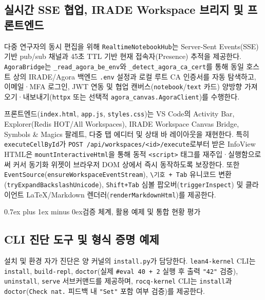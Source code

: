 \documentclass[journal]{IEEEtran}
\makeatletter
\def\section{\@startsection{section}{1}{\z@}{1.5ex plus 1.5ex minus 0.5ex}%
  {0.7ex plus 1ex minus 0ex}{\normalfont\normalsize\centering\bfseries}}%
\newcommand{\code}[1]{\texttt{#1}}
\makeatother
\begin{document}
\subsection{실시간 SSE 협업, IRADE Workspace 브리지 및 프론트엔드}
다중 연구자의 동시 편집을 위해 \code{RealtimeNotebookHub}는 Server-Sent Events(SSE) 기반 pub/sub 채널과 45초 TTL 기반 현재 접속자(Presence) 추적을 제공한다. \code{AgoraBridge}는 \code{\_read\_agora\_be\_env}와 \code{\_detect\_agora\_ca\_cert}를 통해 동일 호스트 상의 IRADE/Agora 백엔드 \code{.env} 설정과 로컬 루트 CA 인증서를 자동 탐색하고, 이메일·MFA 로그인, JWT 연동 및 협업 캔버스(\code{notebook}/\code{text} 카드) 양방향 가져오기·내보내기(\code{httpx} 또는 선택적 \code{agora\_canvas.AgoraClient})를 수행한다.

프론트엔드(\code{index.html}, \code{app.js}, \code{styles.css})는 VS Code의 Activity Bar, Explorer(Redis HOT/All Workspaces), IRADE Workspace Canvas Bridge, Symbols \& Magics 팔레트, 다중 탭 에디터 및 상태 바 레이아웃을 재현한다. 특히 \code{executeCellById}가 \code{POST /api/workspaces/<id>/execute}로부터 받은 InfoView HTML은 \code{mountInteractiveHtml}을 통해 동적 \code{<script>} 태그를 재주입·실행함으로써 커서 동기화 위젯이 브라우저 DOM 상에서 즉시 동작하도록 보장한다. 또한 \code{EventSource}(\code{ensureWorkspaceEventStream}), \code{\textbackslash 기호 + Tab} 유니코드 변환(\code{tryExpandBackslashUnicode}), \code{Shift+Tab} 심볼 팝오버(\code{triggerInspect}) 및 클라이언트 \LaTeX/Markdown 렌더러(\code{renderMarkdownHtml})를 제공한다.

\section{검증 체계, 활용 예제 및 통합 현황 평가}

\subsection{CLI 진단 도구 및 형식 증명 예제}
설치 및 환경 자가 진단은 양 커널의 \code{install.py}가 담당한다. \code{lean4-kernel} CLI는 \code{install}, \code{build-repl}, \code{doctor}(실제 \code{\#eval 40 + 2} 실행 후 출력 \code{"42"} 검증), \code{uninstall}, \code{serve} 서브커맨드를 제공하며, \code{rocq-kernel} CLI는 \code{install}과 \code{doctor}(\code{Check nat.} 피드백 내 \code{"Set"} 포함 여부 검증)를 제공한다.
\end{document}
